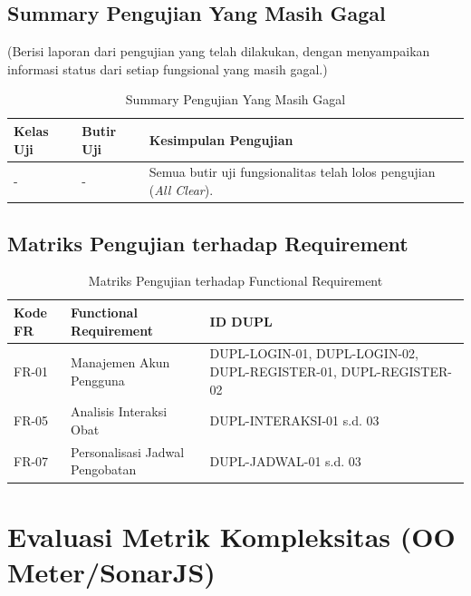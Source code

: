\documentclass[12pt, a4paper]{article}
\begin{document}
\subsection{Summary Pengujian Yang Masih Gagal}

(Berisi laporan dari pengujian yang telah dilakukan, dengan menyampaikan informasi
status dari setiap fungsional yang masih gagal.)

\begin{table}[H]
  \caption{Summary Pengujian Yang Masih Gagal}
  \centering
  \begin{tabularx}{\textwidth}{|X|X|X|}
    \hline
    \textbf{Kelas Uji} & \textbf{Butir Uji} & \textbf{Kesimpulan Pengujian} \\ \hline
    - & - & Semua butir uji fungsionalitas telah lolos pengujian (\textit{All Clear}). \\[4pt] \hline
  \end{tabularx}
\end{table}

\subsection{Matriks Pengujian terhadap Requirement}

\begin{table}[H]
  \caption{Matriks Pengujian terhadap Functional Requirement}
  \centering
  \begin{tabularx}{\textwidth}{|p{2cm}|X|X|}
    \hline
    \textbf{Kode FR} & \textbf{Functional Requirement} & \textbf{ID DUPL} \\ \hline
    FR-01 & Manajemen Akun Pengguna         & DUPL-LOGIN-01, DUPL-LOGIN-02, DUPL-REGISTER-01, DUPL-REGISTER-02 \\ \hline
    FR-05 & Analisis Interaksi Obat         & DUPL-INTERAKSI-01 s.d. 03 \\ \hline
    FR-07 & Personalisasi Jadwal Pengobatan & DUPL-JADWAL-01 s.d. 03 \\ \hline
  \end{tabularx}
\end{table}

\section{Evaluasi Metrik Kompleksitas (OO Meter/SonarJS)}
\end{document}
